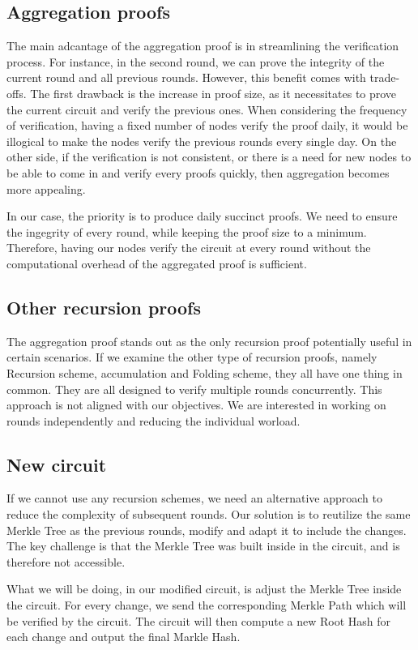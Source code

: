 \subsection{Aggregation proofs}
The main adcantage of the aggregation proof is in streamlining the verification process. For instance, in the second round, we can prove the integrity of the current round and all previous rounds.
However, this benefit comes with trade-offs. The first drawback is the increase in proof size, as it necessitates to prove the current circuit and verify the previous ones.
When considering the frequency of verification, having a fixed number of nodes verify the proof daily, it would be illogical to make the nodes verify the previous rounds every single day.
On the other side, if the verification is not consistent, or there is a need for new nodes to be able to come in and verify every proofs quickly, then aggregation becomes more appealing.

In our case, the priority is to produce daily succinct proofs. We need to ensure the ingegrity of every round, while keeping the proof size to a minimum.
Therefore, having our nodes verify the circuit at every round without the computational overhead of the aggregated proof is sufficient.


\subsection{Other recursion proofs}
The aggregation proof stands out as the only recursion proof potentially useful in certain scenarios. 
If we examine the other type of recursion proofs, namely Recursion scheme, accumulation and Folding scheme, they all have one thing in common.
They are all designed to verify multiple rounds concurrently.
This approach is not aligned with our objectives. We are interested in working on rounds independently and reducing the individual worload.


\subsection{New circuit} 
If we cannot use any recursion schemes, we need an alternative approach to reduce the complexity of subsequent rounds.
Our solution is to reutilize the same Merkle Tree as the previous rounds, modify  and adapt it to include the changes. 
The key challenge is that the Merkle Tree was built inside in the circuit, and is therefore not accessible.

What we will be doing, in our modified circuit, is adjust the Merkle Tree inside the circuit.
For every change, we send the corresponding Merkle Path which will be verified by the circuit. 
The circuit will then compute a new Root Hash for each change and output the final Markle Hash.

